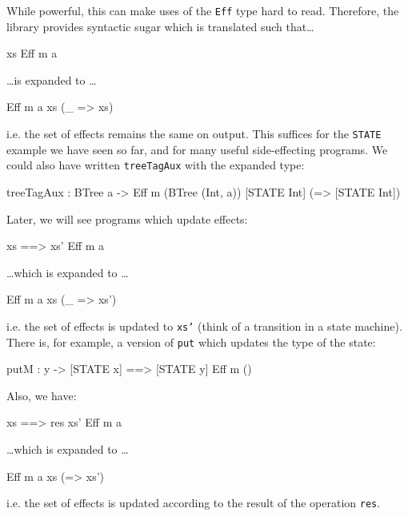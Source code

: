 \noindent
While powerful, this can make uses of the \texttt{Eff} type hard to read.
Therefore, the \effects{} library provides syntactic sugar which is translated
such that\ldots

\begin{code}
{ xs } Eff m a 
\end{code}

\ldots is expanded to \ldots

\begin{code}
Eff m a xs (\_ => xs)
\end{code}

\noindent
i.e. the set of effects remains the same on output. This suffices for the
\texttt{STATE} example we have seen so far, and for many useful side-effecting
programs. We could also have written \texttt{treeTagAux} with the expanded
type:

\begin{code}
treeTagAux : BTree a -> 
             Eff m (BTree (Int, a)) [STATE Int] (\x => [STATE Int])
\end{code}

\noindent
Later, we will see programs which update effects:

\begin{code}
{ xs ==> xs' } Eff m a
\end{code}

\ldots which is expanded to \ldots

\begin{code}
Eff m a xs (\_ => xs')
\end{code}

\noindent
i.e. the set of effects is updated to \texttt{xs'} (think of a transition
in a state machine). There is, for example, a version of \texttt{put} which
updates the type of the state:

\begin{code}
putM : y -> { [STATE x] ==> [STATE y] } Eff m () 
\end{code}

\noindent
Also, we have:

\begin{code}
{ xs ==> {res} xs' } Eff m a
\end{code}

\ldots which is expanded to \ldots

\begin{code}
Eff m a xs (\res => xs')
\end{code}

\noindent
i.e. the set of effects is updated according to the result of the operation
\texttt{res}.




